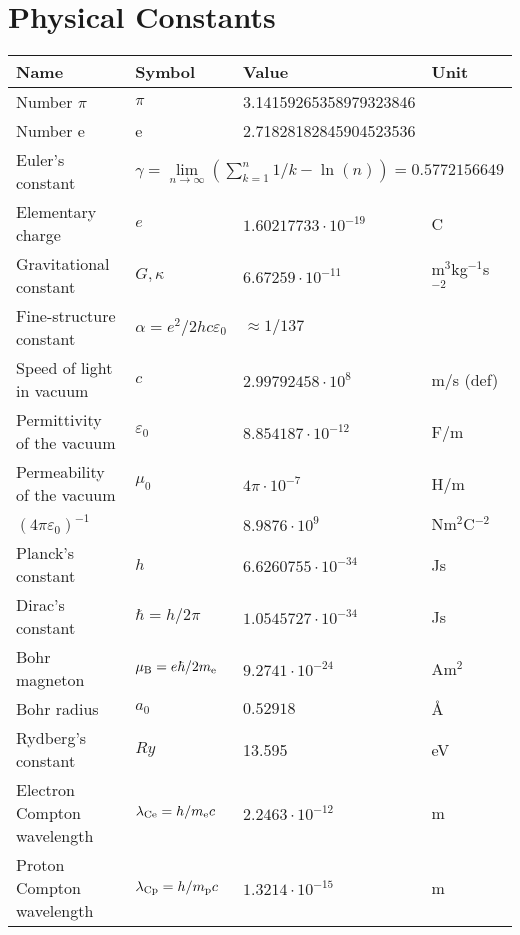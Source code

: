 \tableofcontents
\newpage


\chapter*{\center Physical Constants}
\begin{center}
\begin{tabular}{||l|lll||}
\hline
{\bf Name}&{\bf Symbol}&{\bf Value}&{\bf Unit}\\
\hline
\hline
Number $\pi$                 &$\pi$&3.14159265358979323846&\\
Number e                     &e    &2.71828182845904523536&\\
Euler's constant &\multicolumn{3}{|l||}{$\gamma=\lim\limits_{n\rightarrow\infty}\left(\sum\limits_{k=1}^n 1/k-\ln(n)\right)=0.5772156649$}\\
\hline
Elementary charge            &$e$&$1.60217733\cdot10^{-19}$&C\rule{0pt}{13pt}\\
Gravitational constant       &$G,\kappa$&$6.67259\cdot10^{-11}$&m$^3$kg$^{-1}$s$^{-2}$\\
Fine-structure constant      &$\alpha=e^2/2hc\varepsilon_0$&$\approx1/137$&\\
Speed of light in vacuum     &$c$&$2.99792458\cdot10^8$&m/s (def)\\
Permittivity of the vacuum   &$\varepsilon_0$&$8.854187\cdot10^{-12}$&F/m\\
Permeability of the vacuum   &$\mu_0$&$4\pi\cdot10^{-7}$&H/m\\
$(4\pi\varepsilon_0)^{-1}$   &&$8.9876\cdot10^9$&Nm$^2$C$^{-2}$\\
\hline
Planck's constant            &$h$&$6.6260755\cdot10^{-34}$&Js\rule{0pt}{13pt}\\
Dirac's constant             &$\hbar=h/2\pi$&$1.0545727\cdot10^{-34}$&Js\\
Bohr magneton                &$\mu_{\rm B}=e\hbar/2m_{\rm e}$&$9.2741\cdot10^{-24}$&Am$^2$\\
Bohr radius                  &$a_0$&$0.52918$&\AA\\
Rydberg's constant           &$Ry$&13.595&eV\\
Electron Compton wavelength  &$\lambda_{\rm Ce}=h/m_{\rm e} c$&$2.2463\cdot10^{-12}$&m\\
Proton Compton wavelength    &$\lambda_{\rm Cp}=h/m_{\rm p}c$&$1.3214\cdot10^{-15}$&m\\

\end{tabular}
\end{center}
